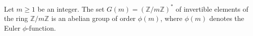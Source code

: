 Let $m \geq 1$ be an integer. The set $G(m) = (\mathbb{Z}/m\mathbb{Z})^*$ of invertible elements of the ring $\mathbb{Z}/m\mathbb{Z}$ is an abelian group of order $\phi(m)$, where $\phi(m)$ denotes the Euler $\phi$-function.
